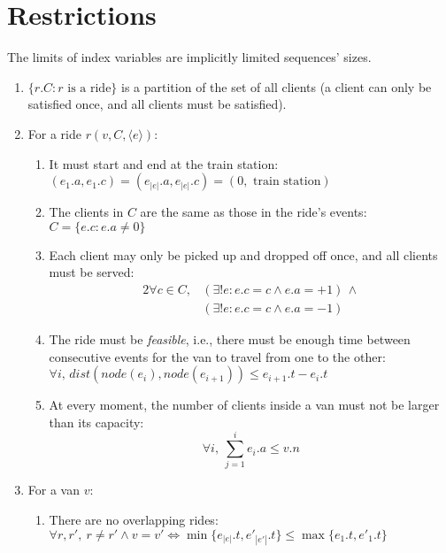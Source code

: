 \section{Restrictions}
The limits of index variables are implicitly limited sequences' sizes.
\begin{enumerate}
    \item $\{r.C : r \text{ is a ride}\}$ is a partition of the set of all clients (a client can only be satisfied once, and all clients must be satisfied).
    \item For a ride $r(v,C,\langle e \rangle)$:
    \begin{enumerate}
        \item It must start and end at the train station: $(e_1.a, e_1.c) = (e_{|e|}.a,e_{|e|}.c)=(0, \text{ train station})$
        \item The clients in $C$ are the same as those in the ride's events: $C=\{e.c : e.a \neq 0\}$
        \item Each client may only be picked up and dropped off once, and all clients must be served:
        \begin{alignat*}{2}
            \forall c \in C,
            &(\exists !e: e.c = c \wedge e.a = +1)\,\wedge \\
            &(\exists !e: e.c = c \wedge e.a = -1)
        \end{alignat*}
        \item The ride must be \emph{feasible}, i.e., there must be enough time between consecutive events for the van to travel from one to the other: $\forall i,\,dist(node(e_i), node(e_{i+1})) \leq e_{i+1}.t - e_i.t$
        \item At every moment, the number of clients inside a van must not be larger than its capacity:
        \begin{equation*}
            \forall i,~\sum_{j=1}^{i}{e_i.a} \leq v.n
        \end{equation*}
    \end{enumerate}
    \item For a van $v$:
    \begin{enumerate}
        \item There are no overlapping rides: $\forall r, r',~r \neq r' \wedge v = v' \iff \min\{e_{|e|}.t,e'_{|e'|}.t\} \leq \max\{e_1.t,e'_1.t\}$
    \end{enumerate}
\end{enumerate}
